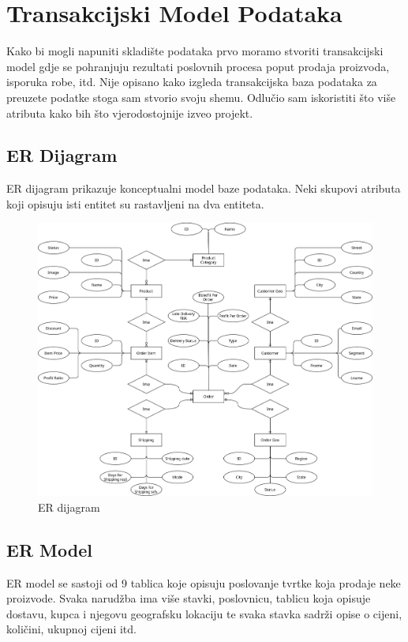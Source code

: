 \documentclass[12pt, oneside]{book}
\begin{document}
\chapter{Transakcijski Model Podataka}
\label{Ctrans}
Kako bi mogli napuniti skladište podataka prvo moramo stvoriti transakcijski model gdje se pohranjuju rezultati poslovnih procesa poput prodaja proizvoda, isporuka robe, itd. Nije opisano kako izgleda transakcijska baza podataka za preuzete podatke stoga sam stvorio svoju shemu. Odlučio sam iskoristiti što više atributa kako bih što vjerodostojnije izveo projekt.


\section{ER Dijagram}
ER dijagram prikazuje konceptualni model baze podataka. Neki skupovi atributa koji opisuju isti entitet su rastavljeni na dva entiteta.

\begin{figure}[h]
\includegraphics[width=16cm]{images/ER_Dijagram.png}
\centering
\caption{ER dijagram}
\end{figure}

\section{ER Model}
ER model se sastoji od 9 tablica koje opisuju poslovanje tvrtke koja prodaje neke proizvode. Svaka narudžba ima više stavki, poslovnicu, tablicu koja opisuje dostavu, kupca i njegovu geografsku lokaciju te svaka stavka sadrži opise o cijeni, količini, ukupnoj cijeni itd. 
\end{document}
